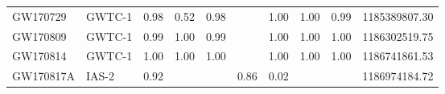 \begin{table*}
\begin{NiceTabular}{@{}ll!{\quad}|c|cc!{\quad}c!{\quad}c!{\quad}cc!{\quad}|c@{}}
  GW170729 &  GWTC-1 &        0.98 &              0.52 &               0.98 &             &         1.00 &             1.00 &             0.99 & 1185389807.30 \\
  GW170809 &  GWTC-1 &        0.99 &              1.00 &               0.99 &             &         1.00 &             1.00 &             1.00 & 1186302519.75 \\
  GW170814 &  GWTC-1 &        1.00 &              1.00 &               1.00 &             &         1.00 &             1.00 &             1.00 & 1186741861.53 \\
 GW170817A &   IAS-2 &        0.92 &                   &                    &        0.86 &         0.02 &                  &                  & 1186974184.72 \\

\end{NiceTabular}
\end{table*}

